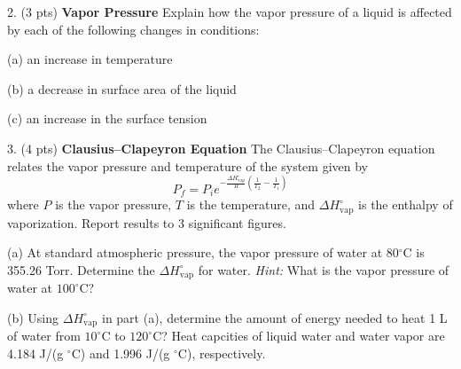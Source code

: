 \documentclass[11pt]{article}
\begin{document}
\pagebreak

2. (3 pts) \textbf{Vapor Pressure} Explain how the vapor pressure of a liquid is affected
by each of the following changes in conditions:

(a) an increase in temperature

(b) a decrease in surface area of the liquid

(c) an increase in the surface tension

\vspace{2in}

%
%
%
%

3. (4 pts) \textbf{Clausius--Clapeyron Equation} The Clausius--Clapeyron equation
relates the vapor pressure and temperature of the system given by
\begin{equation}
  P_f = P_i e^{-\frac{\Delta H^\circ_\text{vap}}{R}(\frac{1}{T_2}-\frac{1}{T_1})}
\end{equation}
where $P$ is the vapor pressure, $T$ is the temperature, and $\Delta H^\circ_\text{vap}$
is the enthalpy of vaporization. Report results to 3 significant figures.

(a) At standard atmospheric pressure, the vapor pressure of water at 80$^\circ$C is
355.26 Torr. Determine the $\Delta H^\circ_\text{vap}$ for water. \textit{Hint:} What is the
vapor pressure of water at $100^\circ$C?

(b) Using $\Delta H^\circ_\text{vap}$ in part (a), determine the amount of energy
needed to heat 1 L of water from $10^\circ$C to $120^\circ$C? Heat capcities of liquid
water and water vapor are 4.184 J/(g $^\circ$C) and 1.996 J/(g $^\circ$C), respectively.
\end{document}
